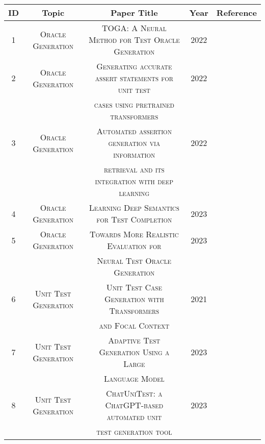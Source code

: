 \begin{table}[H]
\centering


    \begin{tabular}{c|c|c|c|c}
        \hline
        \textbf{ID} & \textbf{Topic} & \textbf{Paper Title} & \textbf{Year} & \textbf{Reference}\\
        \hline 
        1 & \scriptsize\textsc{Oracle Generation} & \scriptsize\textsc{TOGA: A Neural Method for Test Oracle Generation} & 2022 & \cite{gabriel_ryan_toga_2022}\\
        
        2 & \scriptsize\textsc{Oracle Generation} & \scriptsize\textsc{Generating accurate assert statements for unit test} & 2022 & \cite{tufano_generating_2022}\\
        & & \scriptsize\textsc{cases using pretrained transformers} & & \\
        
        3 & \scriptsize\textsc{Oracle Generation} & \scriptsize\textsc{Automated assertion generation via information} & 2022 & \cite{yu_automated_2022}\\
        & & \scriptsize\textsc{retrieval and its integration with deep learning} & & \\
        
        4 & \scriptsize\textsc{Oracle Generation} & \scriptsize\textsc{Learning Deep Semantics for Test Completion} & 2023 & \cite{nie_learning_2023}\\

        5 & \scriptsize\textsc{Oracle Generation} & \scriptsize\textsc{Towards More Realistic Evaluation for} & 2023 & \cite{liu_towards_2023}\\
        & & \scriptsize\textsc{Neural Test Oracle Generation} & & \\
        
        6 & \scriptsize\textsc{Unit Test Generation} & \scriptsize\textsc{Unit Test Case Generation with Transformers} & 2021 & \cite{tufano_unit_2021}\\
        & & \scriptsize\textsc{and Focal Context} & & \\
        
        7 & \scriptsize\textsc{Unit Test Generation} & \scriptsize\textsc{Adaptive Test Generation Using a Large} & 2023 & \cite{schafer_adaptive_2023}\\
        & & \scriptsize\textsc{Language Model} & & \\
        
        8 & \scriptsize\textsc{Unit Test Generation} & \scriptsize\textsc{ChatUniTest: a ChatGPT-based automated unit} & 2023 & \cite{xie_chatunitest_2023}\\
        & & \scriptsize\textsc{test generation tool} & & \\
        

\end{tabular}
\end{table}
